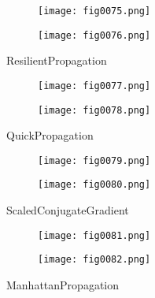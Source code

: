 \begin{figure}[H]
  \begin{subfigure}{0.49\textwidth}
  \texttt{[image: fig0075.png]}
  \label{fig0075}
  \end{subfigure}
  \begin{subfigure}{0.49\textwidth}
  \texttt{[image: fig0076.png]}
  \label{fig0076}
  \end{subfigure}
  \caption{ResilientPropagation}
\end{figure}

\begin{figure}[H]
  \begin{subfigure}{0.49\textwidth}
  \texttt{[image: fig0077.png]}
  \label{fig0077}
  \end{subfigure}
  \begin{subfigure}{0.49\textwidth}
  \texttt{[image: fig0078.png]}
  \label{fig0078}
  \end{subfigure}
  \caption{QuickPropagation}
\end{figure}

\begin{figure}[H]
  \begin{subfigure}{0.49\textwidth}
  \texttt{[image: fig0079.png]}
  \label{fig0079}
  \end{subfigure}
  \begin{subfigure}{0.49\textwidth}
  \texttt{[image: fig0080.png]}
  \label{fig0080}
  \end{subfigure}
  \caption{ScaledConjugateGradient}
\end{figure}

\begin{figure}[H]
  \begin{subfigure}{0.49\textwidth}
  \texttt{[image: fig0081.png]}
  \label{fig0081}
  \end{subfigure}
  \begin{subfigure}{0.49\textwidth}
  \texttt{[image: fig0082.png]}
  \label{fig0082}
  \end{subfigure}
  \caption{ManhattanPropagation}
\end{figure}

